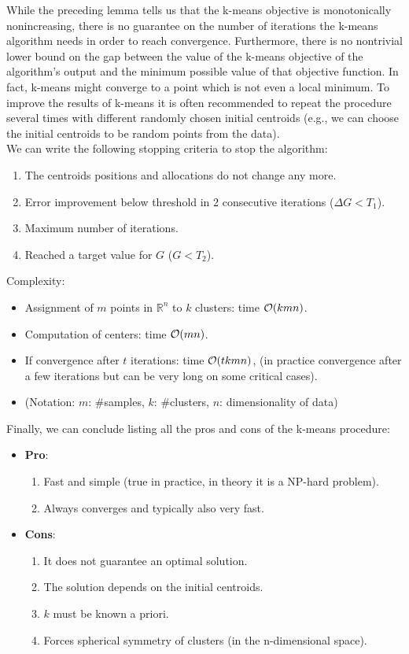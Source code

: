 \documentclass[12pt]{report}
\theoremstyle{plain}
\begin{document}
\begin{flushleft}
While the preceding lemma tells us that the k-means objective is monotonically nonincreasing, there is no guarantee on the number of iterations the k-means algorithm needs in order to reach convergence. Furthermore, there is no nontrivial lower bound on the gap between the value of the k-means objective of the algorithm’s output and the minimum possible value of that objective function. In fact, k-means might converge to a point which is not even a local minimum. To improve the results of k-means it is often recommended to repeat the procedure several times with different randomly chosen initial centroids (e.g., we can choose the initial centroids to be random points from the data).\\
We can write the following stopping criteria to stop the algorithm:
\begin{enumerate}
	\item The centroids positions and allocations do not change any more.
	\item Error improvement below threshold in 2 consecutive iterations ($\Delta G<T_1$).
	\item Maximum number of iterations.
	\item Reached a target value for $G$ ($G<T_2$).
\end{enumerate}
Complexity:
\begin{itemize}
	\item Assignment of $m$ points in $\mathds{R}^n$ to $k$ clusters: time $\order{kmn}$.
	\item Computation of centers: time $\order{mn}$.
	\item If convergence after $t$ iterations: time $\order{tkmn}$, (in practice convergence after a few iterations but can be very long on some	critical cases).
	\item[] (Notation: $m$: \#samples, $k$: \#clusters, $n$: dimensionality of data)
\end{itemize}
Finally, we can conclude listing all the pros and cons of the k-means procedure:
\begin{itemize}
	\item \textbf{Pro}:
	\begin{enumerate}
		\item Fast and simple (true in practice, in theory it is a NP-hard problem).
		\item Always converges and typically also very fast.
	\end{enumerate}
	\item \textbf{Cons}:
	\begin{enumerate}
		\item It does not guarantee an optimal solution.
		\item The solution depends on the initial centroids.
		\item $k$ must be known a priori.
		\item Forces spherical symmetry of clusters (in the n-dimensional space).
	\end{enumerate}
\end{itemize}



\end{flushleft}
\end{document}
